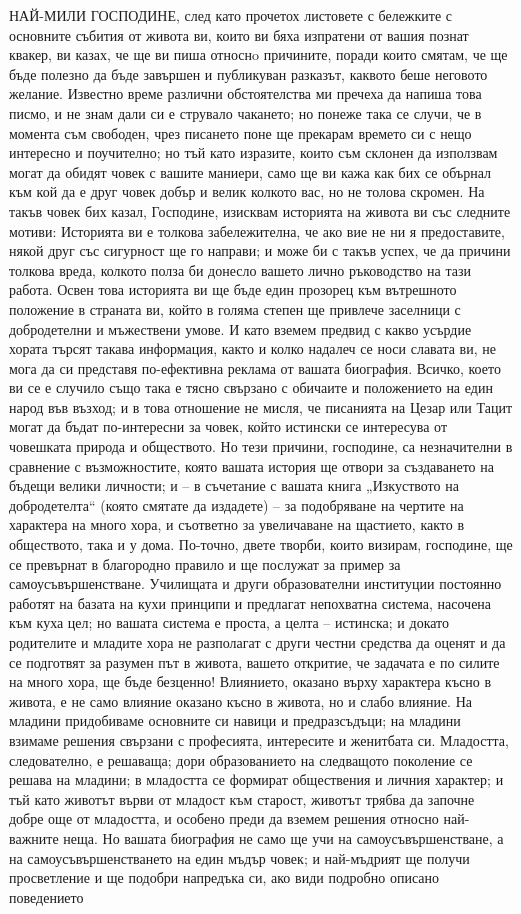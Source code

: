 \documentclass[12pt]{book}
\begin{document}
НАЙ-МИЛИ ГОСПОДИНЕ, след като прочетох листовете с бележките с основните събития от живота ви, които ви бяха изпратени от вашия познат квакер, ви казах, че ще ви пиша относнo причините, поради които смятам, че ще бъде полезно да бъде завършен и публикуван разказът, каквото беше неговото желание. Известно време различни обстоятелства ми пречеха да напиша това писмо, и не знам дали си е струвало чакането; но понеже така се случи, че в момента съм свободен, чрез писането поне ще прекарам времето си с нещо интересно и поучително; но тъй като изразите, които съм склонен да използвам могат да обидят човек с вашите маниери, само ще ви кажа как бих се обърнал към кой да е друг човек добър и велик колкото вас, но не толова скромен. На такъв човек бих казал, Господине, изисквам историята на живота ви със следните мотиви: Историята ви е толкова забележителна, че ако вие не ни я предоставите, някой друг със сигурност ще го направи; и може би с такъв успех, че да причини толкова вреда, колкото полза би донесло вашето лично ръководство на тази работа. Освен това историята ви ще бъде един прозорец към вътрешното положение в страната ви, който в голяма степен ще привлече заселници с добродетелни и мъжествени умове. И като вземем предвид с какво усърдие хората търсят такава информация, както и колко надалеч се носи славата ви, не мога да си представя по-ефективна реклама от вашата биография. Всичко, което ви се е случило също така е тясно свързано с обичаите и положението на един народ във възход; и в това отношение не мисля, че писанията на Цезар или Тацит могат да бъдат по-интересни за човек, който истински се интересува от човешката природа и обществото. Но тези причини, господине, са незначителни в сравнение с възможностите, която вашата история ще отвори за създаването на бъдещи велики личности; и – в съчетание с вашата книга „Изкуството на добродетелта“ (която смятате да издадете) – за подобряване на чертите на характера на много хора, и съответно за увеличаване на щастието, както в обществото, така и у дома. По-точно, двете творби, които визирам, господине, ще се превърнат в благородно правило и ще послужат за пример за самоусъвършенстване. Училищата и други образователни институции постоянно работят на базата на кухи принципи и предлагат непохватна система, насочена към куха цел; но вашата система е проста, а целта – истинска; и докато родителите и младите хора не разполагат с други честни средства да оценят и да се подготвят за разумен път в живота, вашето откритие, че задачата е по силите на много хора, ще бъде безценно! Влиянието, оказано върху характера късно в живота, е не само влияние оказано късно в живота, но и слабо влияние. На младини придобиваме основните си навици и предразсъдъци; на младини взимаме решения свързани с професията, интересите и женитбата си. Младостта, следователно, е решаваща; дори образованието на следващото поколение се решава на младини; в младостта се формират обществения и личния характер; и тъй като животът върви от младост към старост, животът трябва да започне добре още от младостта, и особено преди да вземем решения относно най-важните неща. Но вашата биография не само ще учи на самоусъвършенстване, а на самоусъвършенстването на един мъдър човек; и най-мъдрият ще получи просветление и ще подобри напредъка си, ако види подробно описано поведението 
\end{document}
